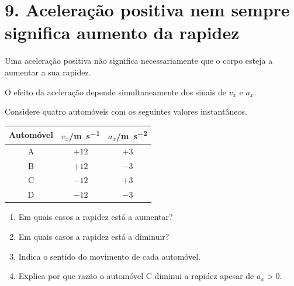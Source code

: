 \documentclass[11pt,a4paper]{article}
\newcommand{\resposta}[1][0.8]{
	\vspace{#1cm}
}
\begin{document}
	\section{9. Aceleração positiva nem sempre significa aumento da rapidez}
	
	\begin{atencao}
		
		Uma aceleração positiva não significa necessariamente que o corpo esteja a
		aumentar a sua rapidez.
		
		O efeito da aceleração depende simultaneamente dos sinais de $v_x$ e
		$a_x$.
		
	\end{atencao}
	
	Considere quatro automóveis com os seguintes valores instantâneos.
	
	\begin{center}
		
		\renewcommand{\arraystretch}{1.35}
		
		\begin{tabular}{c|c|c}
			
			\toprule
			
			\textbf{Automóvel}
			&
			$v_x$/\si{m.s^{-1}}
			&
			$a_x$/\si{m.s^{-2}}
			
			\\
			
			\midrule
			
			A & $+12$ & $+3$\\
			
			B & $+12$ & $-3$\\
			
			C & $-12$ & $+3$\\
			
			D & $-12$ & $-3$\\
			
			\bottomrule
			
		\end{tabular}
		
	\end{center}
	
	\begin{enumerate}[label=\textbf{\arabic*.},resume]
		
		\item Em quais casos a rapidez está a aumentar?
		
		\resposta[0.7]
		
		\item Em quais casos a rapidez está a diminuir?
		
		\resposta[0.7]
		
		\item Indica o sentido do movimento de cada automóvel.
		
		\resposta[0.8]
		
		\item Explica por que razão o automóvel C diminui a rapidez apesar de
		$a_x>0$.
		
		\resposta[1.0]
		
	\end{enumerate}
	
\end{document}
